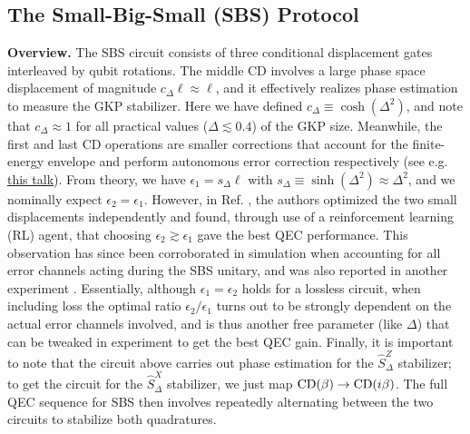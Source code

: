 \subsection{The Small-Big-Small (SBS) Protocol}
\textbf{Overview.} The SBS circuit consists of three conditional displacement gates interleaved by qubit rotations. The middle CD involves a large phase space displacement of magnitude $c_\Delta \ell \approx \ell$, and it effectively realizes phase estimation to measure the GKP stabilizer. Here we have defined $c_\Delta \equiv \cosh(\Delta^2)$, and note that $c_\Delta \approx 1$ for all practical values ($\Delta \lesssim 0.4$) of the GKP size. Meanwhile, the first and last CD operations are smaller corrections that account for the finite-energy envelope and perform autonomous error correction respectively (see e.g. \href{https://youtu.be/TOQzHkgsH_E?t=1045}{this talk}). From theory, we have $\epsilon_1 = s_\Delta \ell$ with $s_\Delta \equiv \sinh(\Delta^2) \approx \Delta^2$, and we nominally expect $\epsilon_2 = \epsilon_1$. However, in Ref. \cite{sivak2023gkp-expt}, the authors optimized the two small displacements independently and found, through use of a reinforcement learning (RL) agent, that choosing $\epsilon_2 \gtrsim \epsilon_1$ gave the best QEC performance. This observation has since been corroborated in simulation when accounting for all error channels acting during the SBS unitary, and was also reported in another experiment \cite{nordquantique2023gkp-expt}. Essentially, although $\epsilon_1 = \epsilon_2$ holds for a lossless circuit, when including loss the optimal ratio $\epsilon_2/\epsilon_1$ turns out to be strongly dependent on the actual error channels involved, and is thus another free parameter (like $\Delta$) that can be tweaked in experiment to get the best QEC gain. Finally, it is important to note that the circuit above carries out phase estimation for the $\hat{S}_\Delta^{Z}$ stabilizer; to get the circuit for the $\hat{S}_\Delta^{X}$ stabilizer, we just map ${\rm CD}(\beta) \to {\rm CD}(i\beta)$. The full QEC sequence for SBS then involves repeatedly alternating between the two circuits to stabilize both quadratures. 

